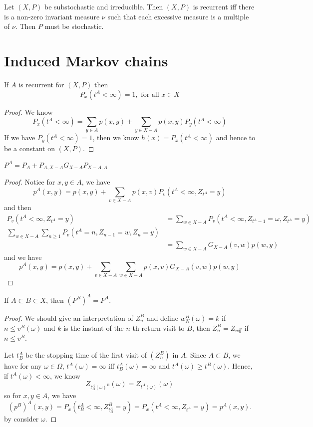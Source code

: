 \documentclass[lang=en,11pt,a4paper,citestyle =authoryear]{elegantpaper}
\begin{document}
\begin{theorem}
    Let $(X,P)$ be substochastic and irreducible. Then $(X,P)$ is recurrent iff there is a non-zero invariant measure $\nu$ such that each excessive measure is a multiple of $\nu$. Then $P$ must be stochastic.
\end{theorem}

\section{Induced Markov chains}

\begin{lemma}
    If $A$ is recurrent for $(X,P)$ then
    \[P_x(t^A < \infty) = 1,\text{ for all }x\in X\]
\end{lemma}
\begin{proof}
    We know
    \[
    P_x(t^A < \infty) = \sum\limits_{y\in A}p(x,y) + \sum\limits_{y\in X-A}p(x,y)P_y(t^A < \infty)
    \]
    If we have $P_y(t^A < \infty)= 1$, then we know $h(x) = P_x(t^A < \infty)$ and hence to be a constant on $(X,P)$.
\end{proof}

\begin{lemma}
    $P^A = P_A + P_{A,X-A}G_{X-A}P_{X-A,A}$
\end{lemma}
\begin{proof}
    Notice for $x,y\in A$, we have
    \[
    p^A(x,y) = p(x,y)+ \sum\limits_{v\in X-A}p(x,v)P_v(t^A<\infty, Z_{t^A} = y)
    \]
    and then
    \[
    \begin{aligned}
    P_v(t^A < \infty,Z_{t^A} = y) &= \sum\limits_{w\in X-A} P_v(t^A<\infty, Z_{t^A - 1} = \omega, Z_{t^A} = y)\\
    \sum\limits_{w\in X-A} \sum\limits_{n\geq 1}P_v(t^A = n, Z_{n-1} = w, Z_n = y) \\ &= \sum\limits_{w\in X-A}G_{X-A}(v,w)p(w,y)
    \end{aligned}
    \]
    and we have
    \[
    p^{A}(x,y) = p(x,y) + \sum\limits_{v\in X-A}\sum\limits_{w \in X-A}p(x,v)G_{X-A}(v,w)p(w,y)
    \]
\end{proof}

\begin{theorem}
    If $A\subset B \subset X$, then $(P^B)^A = P^A$.
\end{theorem}
\begin{proof}
    We should give an interpretation of $Z_n^B$ and define $w_N^B(\omega) = k$ if $n\leq v^B(\omega)$ and $k$ is the instant of the $n$-th return visit to $B$, then $Z_n^B = Z_{w_n^B}$ if $n \leq v^B$.\par
    Let $t^A_B$ be the stopping time of the first visit of $(Z_n^B)$ in $A$. Since $A\subset B$, we have for any $\omega \in \Omega$, $t^A(\omega) = \infty$ iff $t^A_B(\omega) = \infty$ and $t^A(\omega) \geq t^B(\omega)$. Hence, if $t^A(\omega) < \infty$, we know
    \[
    Z_{t_B^A(\omega)^B}(\omega) = Z_{t^A(\omega)}(\omega)
    \]
    so for $x,y \in A$, we have
    \[
    (p^B)^A(x,y) = P_x(t_B^A < \infty, Z_{t_B^A}^B = y) = P_x(t^A < \infty, Z_{t^A} = y) = p^A(x,y).
    \]
    by consider $\omega$.
\end{proof}
\end{document}
